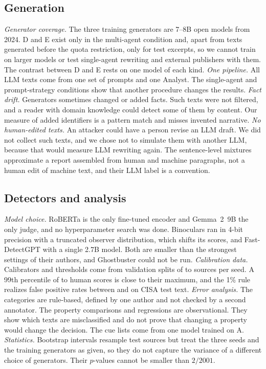 \documentclass[journal]{IEEEtran}
\begin{document}
\subsection{Generation}
\emph{Generator coverage.} The three training generators are 7--8B open models from 2024. D and E exist only in
the multi-agent condition and, apart from texts generated before the quota restriction, only for test excerpts, so
we cannot train on larger models or test single-agent rewriting and external publishers with them. The contrast
between D and E rests on one model of each kind. \emph{One pipeline.} All LLM texts come from one set of prompts
and one Analyst. The single-agent and prompt-strategy conditions show that another procedure changes the results.
\emph{Fact drift.} Generators sometimes changed or added facts. Such texts were not filtered, and a reader with
domain knowledge could detect some of them by content. Our measure of added identifiers is a pattern match and
misses invented narrative. \emph{No human-edited texts.} An attacker could have a person revise an LLM draft. We
did not collect such texts, and we chose not to simulate them with another LLM, because that would measure LLM
rewriting again. The sentence-level mixtures approximate a report assembled from human and machine paragraphs, not
a human edit of machine text, and their LLM label is a convention.

\subsection{Detectors and analysis}
\emph{Model choice.} RoBERTa is the only fine-tuned encoder and Gemma~2~9B the only judge, and no hyperparameter
search was done. Binoculars ran in 4-bit precision with a truncated observer distribution, which shifts its
scores, and Fast-DetectGPT with a single 2.7B model. Both are smaller than the strongest settings of their
authors, and Ghostbuster could not be run. \emph{Calibration data.} Calibrators and thresholds come from validation
splits of \LeakValMin{} to \LeakValMax{} sources per seed. A 99th percentile of \LeakValHumanMin{} to
\LeakValHumanMax{} human scores is close to their maximum, and
the 1\% rule realizes false positive rates between \ThrInLexlrHumoneFpr{} and \ThrInTransHumoneFpr{} on CISA test
text.
\emph{Error analysis.} The categories are rule-based, defined by one author and not checked by a second annotator.
The property comparisons and regressions are observational. They show which texts are misclassified and do not
prove that changing a property would change the decision. The cue lists come from one model trained on A.
\emph{Statistics.} Bootstrap intervals resample test sources but treat the three seeds and the training generators
as given, so they do not capture the variance of a different choice of generators. Their $p$-values cannot be
smaller than $2/2001$.
\end{document}
